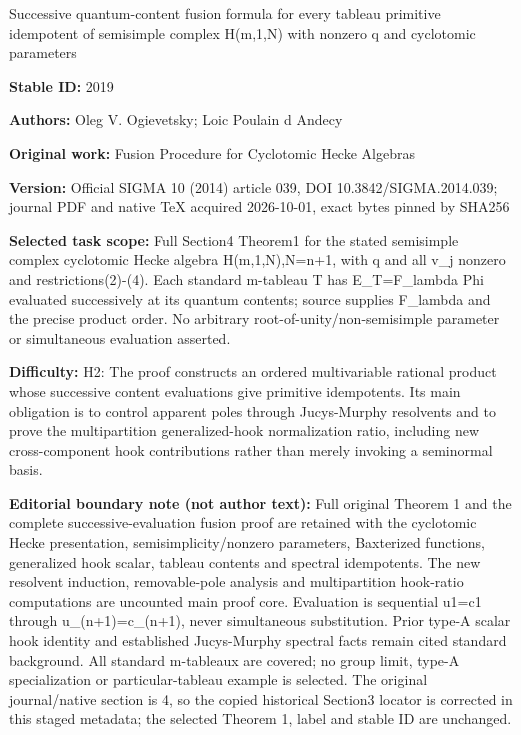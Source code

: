 \documentclass[11pt]{article}
\begin{document}
\begin{center}\Large Successive quantum-content fusion formula for every tableau primitive idempotent of semisimple complex H(m,1,N) with nonzero q and cyclotomic parameters\end{center}
\noindent\textbf{Stable ID:} 2019\par
\noindent\textbf{Authors:} Oleg V. Ogievetsky; Loic Poulain d Andecy\par
\noindent\textbf{Original work:} Fusion Procedure for Cyclotomic Hecke Algebras\par
\noindent\textbf{Version:} Official SIGMA 10 (2014) article 039, DOI 10.3842/SIGMA.2014.039; journal PDF and native TeX acquired 2026-10-01, exact bytes pinned by SHA256\par
\noindent\textbf{Selected task scope:} Full Section4 Theorem1 for the stated semisimple complex cyclotomic Hecke algebra H(m,1,N),N=\allowbreak{}n+\allowbreak{}1, with q and all v\_j nonzero and restrictions(2)-(4). Each standard m-tableau T has E\_T=\allowbreak{}F\_lambda Phi evaluated successively at its quantum contents; source supplies F\_lambda and the precise product order. No arbitrary root-of-unity/non-semisimple parameter or simultaneous evaluation asserted.\par
\noindent\textbf{Difficulty:} H2: The proof constructs an ordered multivariable rational product whose successive content evaluations give primitive idempotents. Its main obligation is to control apparent poles through Jucys-Murphy resolvents and to prove the multipartition generalized-hook normalization ratio, including new cross-component hook contributions rather than merely invoking a seminormal basis.\par
\noindent\textbf{Editorial boundary note (not author text):} Full original Theorem 1 and the complete successive-evaluation fusion proof are retained with the cyclotomic Hecke presentation, semisimplicity/nonzero parameters, Baxterized functions, generalized hook scalar, tableau contents and spectral idempotents. The new resolvent induction, removable-pole analysis and multipartition hook-ratio computations are uncounted main proof core. Evaluation is sequential u1=\allowbreak{}c1 through u\_(n+\allowbreak{}1)=\allowbreak{}c\_(n+\allowbreak{}1), never simultaneous substitution. Prior type-A scalar hook identity and established Jucys-Murphy spectral facts remain cited standard background. All standard m-tableaux are covered; no group limit, type-A specialization or particular-tableau example is selected. The original journal/native section is 4, so the copied historical Section3 locator is corrected in this staged metadata; the selected Theorem 1, label and stable ID are unchanged.\par
\end{document}

